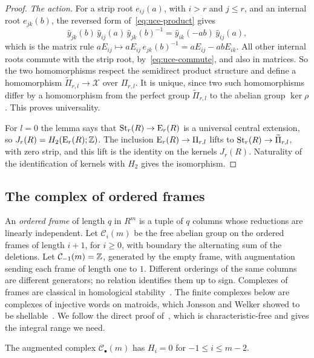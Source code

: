 \begin{proof}
\emph{The action.} For a strip root $e_{ij}(a)$, with $i>r$ and $j\leq r$, and an internal root $e_{jk}(b)$, the reversed
form of~\eqref{eq:uce-product} gives
\[
 \hat y_{jk}(b)\,\hat y_{ij}(a)\,\hat y_{jk}(b)^{-1}=\hat y_{ik}(-ab)\,\hat y_{ij}(a),
\]
which is the matrix rule $aE_{ij}\mapsto aE_{ij}\,e_{jk}(b)^{-1}=aE_{ij}-abE_{ik}$. All other internal roots commute with
the strip root, by~\eqref{eq:uce-commute}, and also in matrices. So the two homomorphisms respect the semidirect product
structure and define a homomorphism $\widetilde\Pi_{r,l}\to\mathcal X$ over $\Pi_{r,l}$. It is unique, since two
such homomorphisms differ by a homomorphism from the perfect group $\widetilde\Pi_{r,l}$ to the abelian group
$\ker\rho$. This proves universality.

For $l=0$ the lemma says that $\operatorname{St}_r(R)\to\operatorname{E}_r(R)$ is a universal central extension, so $J_r(R)=H_2(\operatorname{E}_r(R);\mathbb Z)$. The
inclusion $\operatorname{E}_r(R)\to\Pi_{r,l}$ lifts to $\operatorname{St}_r(R)\to\widetilde\Pi_{r,l}$, with zero strip, and this lift
is the identity on the kernels $J_r(R)$. Naturality of the identification of kernels with $H_2$ gives the isomorphism.
\end{proof}

\subsection{The complex of ordered frames}

An \emph{ordered frame} of length $q$ in $R^m$ is a tuple of $q$ columns whose reductions are linearly independent. Let
$\mathcal C_i(m)$ be the free abelian group on the ordered frames of length $i+1$, for $i\geq0$, with boundary the
alternating sum of the deletions. Let $\mathcal C_{-1}(m)=\mathbb Z$, generated by the empty frame, with augmentation sending
each frame of length one to $1$. Different orderings of the same columns are different generators; no relation
identifies them up to sign. Complexes of frames are classical in homological stability~\cite{vanderKallen1980}. The
finite complexes below are complexes of injective words on matroids, which Jonsson and Welker showed to be
shellable~\cite[Theorem~1.2 and Example~3.3]{JonssonWelker2009}. We follow the direct proof of~\cite[Lemma~7.4]{OAI247rf},
which is characteristic-free and gives the integral range we need.

\begin{lemma}\label{lem:st-ordered}
The augmented complex $\mathcal C_\bullet(m)$ has $H_i=0$ for $-1\leq i\leq m-2$.
\end{lemma}

